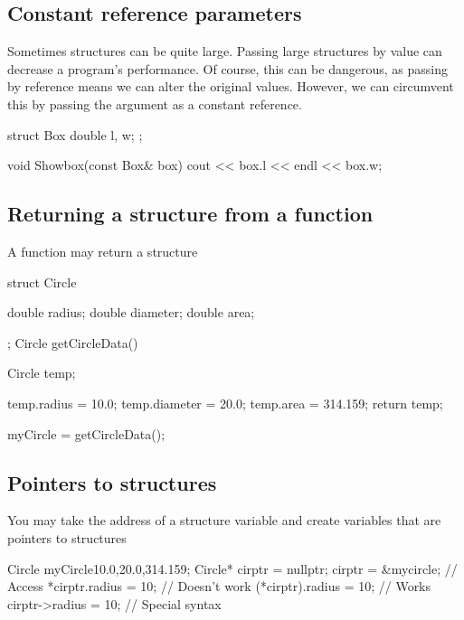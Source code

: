 \documentclass{report}
\begin{document}
	\subsection{Constant reference parameters}
	\bigbreak \noindent 
	\begin{concept}
	   Sometimes structures can be quite large. Passing large structures by value can decrease a program's performance. Of course, this can be dangerous, as passing by reference means we can alter the original values. However, we can circumvent this by passing the argument as a constant reference.
	\end{concept}
	\bigbreak \noindent 
	
	\begin{cppcode}
struct Box {
    double l, w;
};

void Showbox(const Box& box) {
    cout << box.l << endl << box.w;
}
	\end{cppcode}
	

	\bigbreak \noindent 
	\subsection{Returning a structure from a function}
	\bigbreak \noindent 
	\begin{concept}
	   A function may return a structure 
	\end{concept}
	\bigbreak \noindent 
	
	\begin{cppcode}
struct Circle {
    double radius;
    double diameter;
    double area;

};
Circle getCircleData() {
    Circle temp;

    temp.radius = 10.0;
    temp.diameter = 20.0;
    temp.area = 314.159;
    return temp;
}
myCircle = getCircleData();
	\end{cppcode}
	

	\pagebreak
	\subsection{Pointers to structures}
	\bigbreak \noindent 
	\begin{concept}
	   You may take the address of a structure variable and create variables that are pointers to structures 
	\end{concept}
	\bigbreak \noindent 
	
	\begin{cppcode}
Circle myCircle{10.0,20.0,314.159};
Circle* cirptr = nullptr;
cirptr = &mycircle;
// Access
*cirptr.radius = 10; // Doesn't work
(*cirptr).radius = 10; // Works
cirptr->radius = 10; // Special syntax
	\end{cppcode}
	
\end{document}
